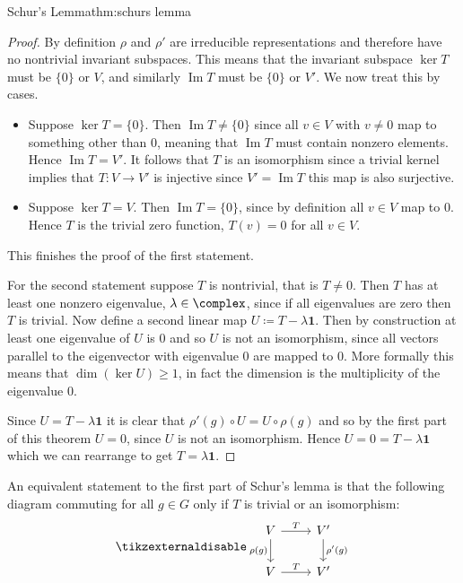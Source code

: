 \documentclass[fleqn]{NotesClass}
\DeclareMathOperator{\image}{Im}
\newcommand*{\ident}{\mathbf{1}}
\begin{document}
\begin{thm}{Schur's Lemma}{thm:schurs lemma}
\begin{proof}
            By definition \(\rho\) and \(\rho'\) are irreducible representations and therefore have no nontrivial invariant subspaces.
            This means that the invariant subspace \(\ker T\) must be \(\{0\}\) or \(V\), and similarly \(\image T\) must be \(\{0\}\) or \(V'\).
            We now treat this by cases.
            \begin{itemize}
                \item Suppose \(\ker T = \{0\}\).
                Then \(\image T \ne \{0\}\) since all \(v \in V\) with \(v \ne 0\) map to something other than \(0\), meaning that \(\image T\) must contain nonzero elements.
                Hence \(\image T = V'\).
                It follows that \(T\) is an isomorphism since a trivial kernel implies that \(T \colon V \to V'\) is injective since \(V' = \image T\) this map is also surjective.
                \item Suppose \(\ker T = V\).
                Then \(\image T = \{0\}\), since by definition all \(v \in V\) map to \(0\).
                Hence \(T\) is the trivial zero function, \(T(v) = 0\) for all \(v \in V\).
            \end{itemize}
            This finishes the proof of the first statement.
            
            For the second statement suppose \(T\) is nontrivial, that is \(T \ne 0\).
            Then \(T\) has at least one nonzero eigenvalue, \(\lambda \in \complex\), since if all eigenvalues are zero then \(T\) is trivial.
            Now define a second linear map \(U \coloneqq T - \lambda\ident\).
            Then by construction at least one eigenvalue of \(U\) is 0 and so \(U\) is not an isomorphism, since all vectors parallel to the eigenvector with eigenvalue 0 are mapped to 0.
            More formally this means that \(\dim(\ker U) \ge 1\), in fact the dimension is the multiplicity of the eigenvalue 0.
            
            Since \(U = T - \lambda \ident\) it is clear that \(\rho'(g) \circ U = U \circ \rho(g)\) and so by the first part of this theorem \(U = 0\), since \(U\) is not an isomorphism.
            Hence \(U = 0 = T - \lambda \ident\) which we can rearrange to get \(T = \lambda \ident\).
        \end{proof}
    \end{thm}
    
    An equivalent statement to the first part of Schur's lemma is that the following diagram commuting for all \(g \in G\) only if \(T\) is trivial or an isomorphism:
    \begin{equation}
        \tikzexternaldisable
        \begin{tikzcd}
            V \ar[r, "T"]\ar[d, "\rho(g)"'] & V' \ar[d, "\rho'(g)"]\\
            V \ar[r, "T"]& V'
        \end{tikzcd}
    \end{equation}
    
\end{document}
